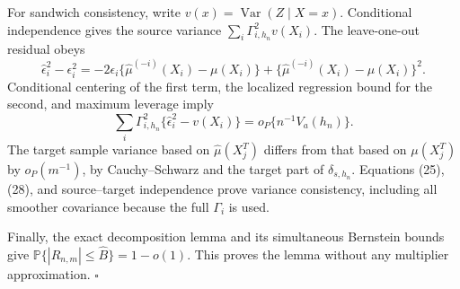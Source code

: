 For sandwich consistency, write \(v(x)=\operatorname{Var}(Z\mid X=x)\).  Conditional independence gives the source variance \(\sum_i\Gamma_{i,h_n}^2v(X_i)\).  The leave-one-out residual obeys
\[
 \widehat\epsilon_i^2-\epsilon_i^2
 =-2\epsilon_i\{\widehat\mu^{(-i)}(X_i)-\mu(X_i)\}
 +\{\widehat\mu^{(-i)}(X_i)-\mu(X_i)\}^2.
\tag{27}
\]
Conditional centering of the first term, the localized regression bound for the second, and maximum leverage imply
\[
 \sum_i\Gamma_{i,h_n}^2\{\widehat\epsilon_i^2-v(X_i)\}
 =o_P\{n^{-1}V_a(h_n)\}.
\tag{28}
\]
The target sample variance based on \(\widehat\mu(X_j^T)\) differs from that based on \(\mu(X_j^T)\) by \(o_P(m^{-1})\), by Cauchy--Schwarz and the target part of \(\delta_{s,h_n}\).  Equations (25), (28), and source--target independence prove variance consistency, including all smoother covariance because the full \(\Gamma_i\) is used.

Finally, the exact decomposition lemma and its simultaneous Bernstein bounds give \(\mathbb P\{|R_{n,m}|\le\widehat B\}=1-o(1)\).  This proves the lemma without any multiplier approximation. \(\square\)